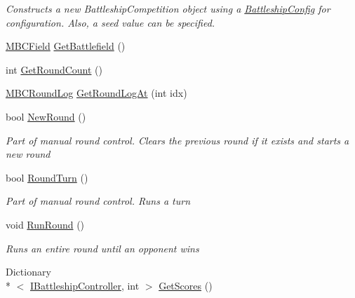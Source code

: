 \begin{DoxyCompactItemize}
\begin{DoxyCompactList}\small\item\em Constructs a new Battleship\-Competition object using a \hyperlink{class_m_b_c_1_1_core_1_1_battleship_config}{Battleship\-Config} for configuration. Also, a seed value can be specified.\end{DoxyCompactList}\item 
\hyperlink{class_m_b_c_1_1_core_1_1_m_b_c_field}{M\-B\-C\-Field} \hyperlink{class_m_b_c_1_1_core_1_1_m_b_c_competition_a97578e55ceff3692ccf823b9f1ea1829}{Get\-Battlefield} ()
\item 
int \hyperlink{class_m_b_c_1_1_core_1_1_m_b_c_competition_aa2e2f3676037c53228955718329c3882}{Get\-Round\-Count} ()
\item 
\hyperlink{class_m_b_c_1_1_core_1_1_m_b_c_round_log}{M\-B\-C\-Round\-Log} \hyperlink{class_m_b_c_1_1_core_1_1_m_b_c_competition_a36d7ec45451ec65b2a68c44162f7c0d7}{Get\-Round\-Log\-At} (int idx)
\item 
bool \hyperlink{class_m_b_c_1_1_core_1_1_m_b_c_competition_ac7a7ba124d588f24917f7cfcf38b6cfe}{New\-Round} ()
\begin{DoxyCompactList}\small\item\em Part of manual round control. Clears the previous round if it exists and starts a new round\end{DoxyCompactList}\item 
bool \hyperlink{class_m_b_c_1_1_core_1_1_m_b_c_competition_af5c32fff03c9ea5ad80d3cd4e1238f74}{Round\-Turn} ()
\begin{DoxyCompactList}\small\item\em Part of manual round control. Runs a turn\end{DoxyCompactList}\item 
\hypertarget{class_m_b_c_1_1_core_1_1_m_b_c_competition_a04554bd84bd4ec967de1f3119054ec2b}{void \hyperlink{class_m_b_c_1_1_core_1_1_m_b_c_competition_a04554bd84bd4ec967de1f3119054ec2b}{Run\-Round} ()}\label{class_m_b_c_1_1_core_1_1_m_b_c_competition_a04554bd84bd4ec967de1f3119054ec2b}

\begin{DoxyCompactList}\small\item\em Runs an entire round until an opponent wins\end{DoxyCompactList}\item 
\hypertarget{class_m_b_c_1_1_core_1_1_m_b_c_competition_ae16e71f3406d372252d0cb1e157a82b1}{Dictionary\\*
$<$ \hyperlink{interface_m_b_c_1_1_core_1_1_i_battleship_controller}{I\-Battleship\-Controller}, int $>$ \hyperlink{class_m_b_c_1_1_core_1_1_m_b_c_competition_ae16e71f3406d372252d0cb1e157a82b1}{Get\-Scores} ()}\label{class_m_b_c_1_1_core_1_1_m_b_c_competition_ae16e71f3406d372252d0cb1e157a82b1}


\end{DoxyCompactItemize}
